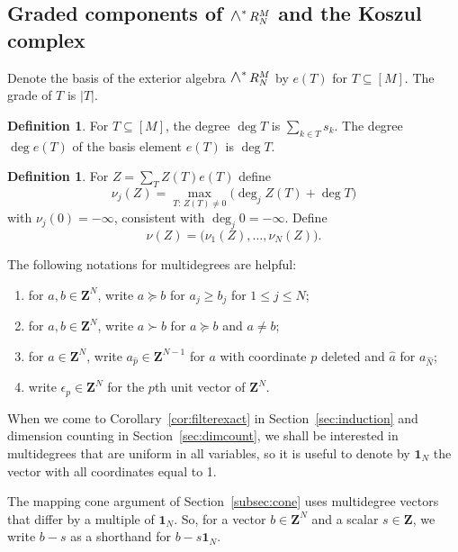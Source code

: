\documentclass[12pt]{amsart}
\theoremstyle{definition}
\newtheorem{definition1}[theorem]{Definition}
\theoremstyle{remark}
\def\what{\hat}
\newcommand{\Z}{\mathbf Z}
\newcommand{\One}{\mathbf{1}}
\newcommand{\WedgeAux}[2]{\scalebox{1.35}{$#1\wedge$}}
\newcommand{\Wedge}{\mathop{\mathpalette\WedgeAux\relax}\nolimits}
\begin{document}
\subsection{Graded components of \texorpdfstring{$\Wedge^* R_N^M$}{the exterior algebra} and the Koszul complex}

Denote the basis of the exterior algebra $\Wedge^* R_N^M$ by $e(T)$ for $T\subseteq[M]$.
The grade of $T$ is $|T|$.

\begin{definition1}
  For $T \subseteq [M]$, 
  the degree $\deg T$ is $\sum_{k\in T} s_k$.
  The degree $\deg e(T)$ of the basis element $e(T)$ is $\deg T$.
\end{definition1}
\begin{definition1}
  For $Z=\sum_TZ(T)e(T)$ define
  \[\nu_j(Z)=\max_{T:\,Z(T)\neq 0}\bigl(\deg_jZ(T)+\deg T\bigr) \]
  with $\nu_j(0) = -\infty$, consistent with $\deg_j 0 = -\infty$.  Define
  \[ \nu (Z) = \bigl( \nu_1(Z), \ldots, \nu_N(Z) \bigr). \]
\end{definition1}
The following notations for multidegrees are helpful: 
\begin{enumerate}
\item for $a, b \in \Z^N$,
write $a \succeq b$ for $a_j \geq b_j$ for $1 \leq j \leq N$;
\item for $a, b \in \Z^N$,
write $a \succ b$ for $a \succeq b$ and $a \neq b$;
\item for $a \in \Z^N$, write $a_{\what p} \in \Z^{N-1}$ for
$a$ with coordinate $p$ deleted and ${\what a}$ for $a_{\what N}$;
\item write $\epsilon_p \in \Z^N$ for the $p$th unit vector of $\Z^N$.
\end{enumerate} 

When we come to Corollary~\ref{cor:filterexact} in
Section~\ref{sec:induction} and dimension counting in
Section~\ref{sec:dimcount}, we shall be interested in multidegrees
that are uniform in all variables, so it is useful to denote by
$\One_N$ the vector with all coordinates equal to 1.

The mapping cone argument of Section~\ref{subsec:cone} 
uses multidegree vectors that differ by a multiple of $\One_N$.
So, for a vector $b \in \Z^N$ and a scalar $s \in \Z$, we write $b-s$ 
as a shorthand for $b - s \One_N$.
\end{document}
